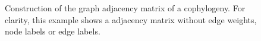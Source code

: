 \begin{figure}
    \centering
    \caption{Construction of the graph adjacency matrix of a cophylogeny. For clarity, this example shows a adjacency matrix without edge weights, node labels or edge labels. }
    \label{fig:adjacency}
\end{figure}
